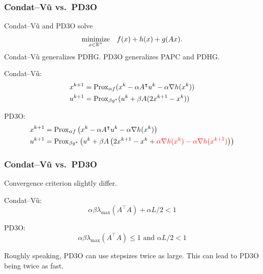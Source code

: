 \documentclass[10pt,mathserif]{beamer}
\begin{document}
\begin{frame}
\frametitle{Condat--V\~u vs.\ PD3O}
Condat--V\~u and PD3O  solve 
\[
\begin{array}{ll}
\underset{\substack{x\in \mathbb{R}^n}}{\mbox{minimize}}&f(x)+h(x)+g(Ax).
\end{array}
\]
Condat--V\~u generalizes PDHG.
PD3O generalizes PAPC and PDHG.

\vspace{0.2in}

Condat--V\~u:
\begin{align*}
x^{k+1}&=
\mathrm{Prox}_{\alpha f}(x^k-\alpha A^\intercal u ^k-\alpha \nabla h(x^k))\\
 u ^{k+1}&=
\mathrm{Prox}_{\beta g^*}( u ^k+\beta A(2x^{k+1}-x^k))
\end{align*}


PD3O:
\begin{align*}
    x^{k+1}&=\mathrm{Prox}_{\alpha f}\left(x^{k}-\alpha A^\intercal u ^{k}-\alpha \nabla h(x^{k})\right)\\
     u^{k+1}&=\mathrm{Prox}_{\beta g^*}\left(     u^k+\beta A\left(2x^{k+1}-x^{k} + {\color{red}\alpha \nabla h(x^{k}) - \alpha \nabla h(x^{k+1})}\right)
    \right)
\end{align*}
\end{frame}





\begin{frame}
\frametitle{Condat--V\~u vs.\ PD3O}
Convergence criterion slightly differ.

\vspace{0.2in}
Condat--V\~u:
\[\alpha\beta\lambda_\mathrm{max}(A^\intercal A)+\alpha L/2<1\]


PD3O:
\[\alpha\beta\lambda_\mathrm{max}(A^\intercal A)\le 1\text{ and }\alpha L/2<1\]

\vspace{0.2in}

Roughly speaking, PD3O can use stepsizes twice as large.
This can lead to PD3O being twice as fast.
\end{frame}
\end{document}
